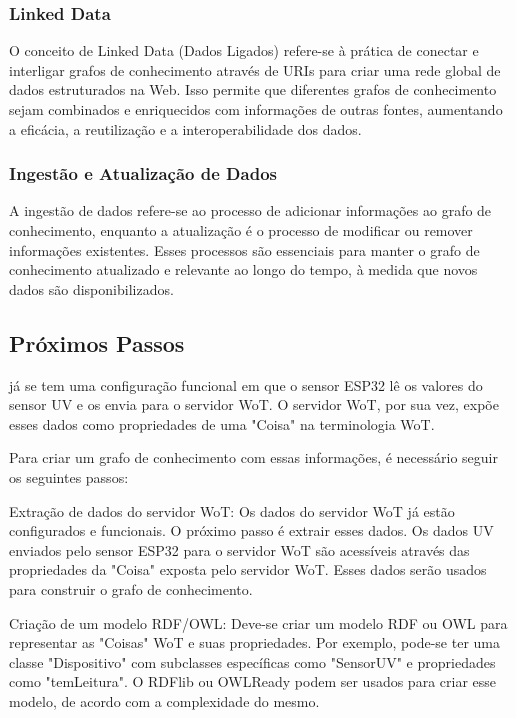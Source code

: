 \subsubsection{Linked Data}

O conceito de Linked Data (Dados Ligados) refere-se à prática de conectar e interligar grafos de conhecimento através de URIs para criar uma rede global de dados estruturados na Web. Isso permite que diferentes grafos de conhecimento sejam combinados e enriquecidos com informações de outras fontes, aumentando a eficácia, a reutilização e a interoperabilidade dos dados.

\subsubsection{Ingestão e Atualização de Dados}

A ingestão de dados refere-se ao processo de adicionar informações ao grafo de conhecimento, enquanto a atualização é o processo de modificar ou remover informações existentes. Esses processos são essenciais para manter o grafo de conhecimento atualizado e relevante ao longo do tempo, à medida que novos dados são disponibilizados.

\subsection{Próximos Passos}

já se tem uma configuração funcional em que o sensor ESP32 lê os valores do sensor UV e os envia para o servidor WoT. O servidor WoT, por sua vez, expõe esses dados como propriedades de uma "Coisa" na terminologia WoT.

Para criar um grafo de conhecimento com essas informações, é necessário seguir os seguintes passos:

Extração de dados do servidor WoT: Os dados do servidor WoT já estão configurados e funcionais. O próximo passo é extrair esses dados. Os dados UV enviados pelo sensor ESP32 para o servidor WoT são acessíveis através das propriedades da "Coisa" exposta pelo servidor WoT. Esses dados serão usados para construir o grafo de conhecimento.

Criação de um modelo RDF/OWL: Deve-se criar um modelo RDF ou OWL para representar as "Coisas" WoT e suas propriedades. Por exemplo, pode-se ter uma classe "Dispositivo" com subclasses específicas como "SensorUV" e propriedades como "temLeitura". O RDFlib ou OWLReady podem ser usados para criar esse modelo, de acordo com a complexidade do mesmo.

